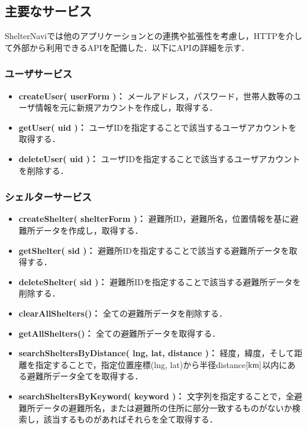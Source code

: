 \documentclass[technicalreport]{ieicej}
\begin{document}
\subsection{主要なサービス}
ShelterNaviでは他のアプリケーションとの連携や拡張性を考慮し，HTTPを介して外部から利用できるAPIを配備した．以下にAPIの詳細を示す．

\subsubsection{ユーザサービス}
\begin{itemize}
    \item{\textbf{createUser( userForm )：}
         メールアドレス，パスワード，世帯人数等のユーザ情報を元に新規アカウントを作成し，取得する．}
    \item{\textbf{getUser( uid )：}
         ユーザIDを指定することで該当するユーザアカウントを取得する．}
    \item{\textbf{deleteUser( uid )：}
         ユーザIDを指定することで該当するユーザアカウントを削除する．}
\end{itemize}

\subsubsection{シェルターサービス}
\begin{itemize}
    \item{\textbf{createShelter( shelterForm )：}
         避難所ID，避難所名，位置情報を基に避難所データを作成し，取得する．}
    \item{\textbf{getShelter( sid )：}
         避難所IDを指定することで該当する避難所データを取得する．}
    \item{\textbf{deleteShelter( sid )：}
         避難所IDを指定することで該当する避難所データを削除する．}
    \item{\textbf{clearAllShelters()：}
         全ての避難所データを削除する．}
    \item{\textbf{getAllShelters()：}
         全ての避難所データを取得する．}
    \item{\textbf{searchSheltersByDistance( lng, lat, distance )：}
         経度，緯度，そして距離を指定することで，指定位置座標(lng, lat)から半径distance$\rm[km]$以内にある避難所データ全てを取得する．}
    \item{\textbf{searchSheltersByKeyword( keyword )：}
         文字列を指定することで，全避難所データの避難所名，または避難所の住所に部分一致するものがないか検索し，該当するものがあればそれらを全て取得する．}
\end{itemize}
\end{document}

